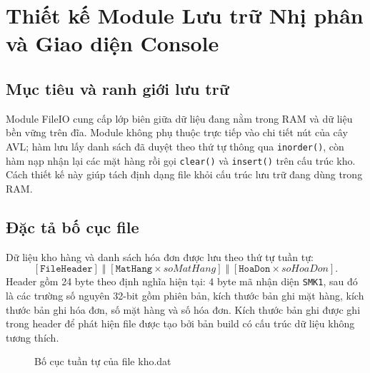 \section{Thiết kế Module Lưu trữ Nhị phân và Giao diện Console}

\subsection{Mục tiêu và ranh giới lưu trữ}
Module FileIO cung cấp lớp biên giữa dữ liệu đang nằm trong RAM và dữ liệu bền vững trên đĩa. Module không phụ thuộc trực tiếp vào chi tiết nút của cây AVL; hàm lưu lấy danh sách đã duyệt theo thứ tự thông qua \texttt{inorder()}, còn hàm nạp nhận lại các mặt hàng rồi gọi \texttt{clear()} và \texttt{insert()} trên cấu trúc kho. Cách thiết kế này giúp tách định dạng file khỏi cấu trúc lưu trữ đang dùng trong RAM.

\subsection{Đặc tả bố cục file}
Dữ liệu kho hàng và danh sách hóa đơn được lưu theo thứ tự tuần tự:
\[
  [\texttt{FileHeader}]\;\Vert\;[\texttt{MatHang}\times soMatHang]\;\Vert\;[\texttt{HoaDon}\times soHoaDon].
\]
Header gồm 24 byte theo định nghĩa hiện tại: 4 byte mã nhận diện \texttt{SMK1}, sau đó là các trường số nguyên 32-bit gồm phiên bản, kích thước bản ghi mặt hàng, kích thước bản ghi hóa đơn, số mặt hàng và số hóa đơn. Kích thước bản ghi được ghi trong header để phát hiện file được tạo bởi bản build có cấu trúc dữ liệu không tương thích.

\begin{figure}[H]
\centering
{}
\caption{Bố cục tuần tự của file kho.dat}
\label{fig:file_layout}
\end{figure}

